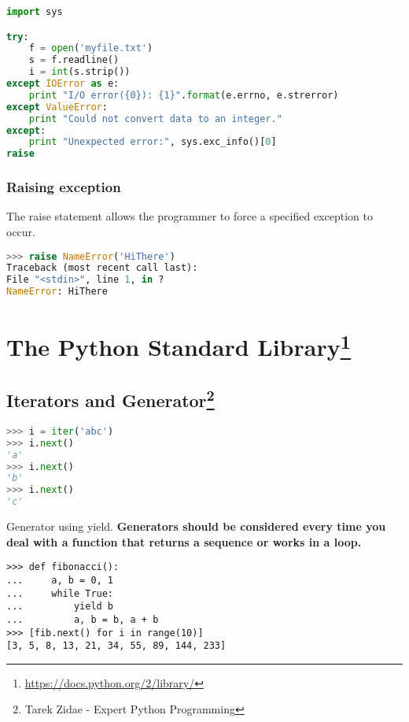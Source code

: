 \documentclass[fleqn,10pt]{SelfArx} %
\begin{document}
	\begin{lstlisting}[language=Python, basicstyle=\scriptsize]
import sys

try:
	f = open('myfile.txt')
	s = f.readline()
	i = int(s.strip())
except IOError as e:
	print "I/O error({0}): {1}".format(e.errno, e.strerror)
except ValueError:
	print "Could not convert data to an integer."
except:
	print "Unexpected error:", sys.exc_info()[0]
raise
	\end{lstlisting}
	
	\subsubsection{Raising exception}
	The raise statement allows the programmer to force a specified exception to occur. 
	\begin{lstlisting}[language=Python, basicstyle=\scriptsize]
>>> raise NameError('HiThere')
Traceback (most recent call last):
File "<stdin>", line 1, in ?
NameError: HiThere
	\end{lstlisting}
	
	
	\section[The Python Standard Library]{The Python Standard Library\footnote{\url{https://docs.python.org/2/library/}}} 
	
	\subsection[Iterators and Generator]{Iterators and Generator\footnote{Tarek Zidae - Expert Python Programming}}
	
	\begin{lstlisting}[language=Python, basicstyle=\scriptsize]
>>> i = iter('abc')
>>> i.next()
'a'
>>> i.next()
'b'
>>> i.next()
'c'
	\end{lstlisting}
	
	Generator using yield. \textbf{Generators should be considered every time you deal with a function that returns a sequence or works in a loop.}
	
	\begin{lstlisting}
>>> def fibonacci():
... 	a, b = 0, 1
... 	while True:
... 		yield b
... 		a, b = b, a + b
>>> [fib.next() for i in range(10)] 
[3, 5, 8, 13, 21, 34, 55, 89, 144, 233]
	\end{lstlisting}	
\end{document}
